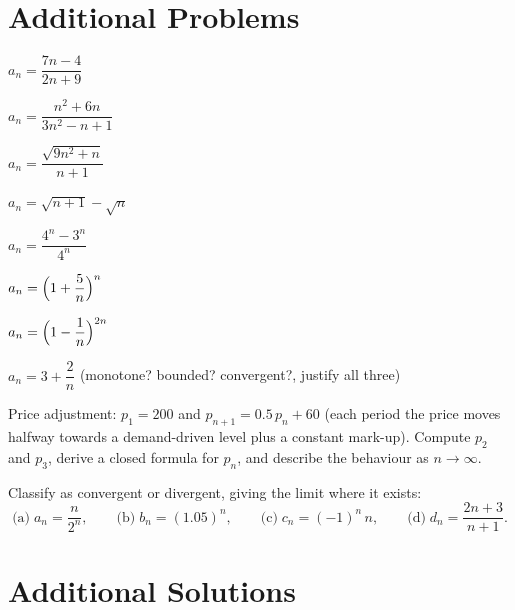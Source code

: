 \section{Additional Problems}

\begin{problems}
  \item $a_{n}=\dfrac{7n-4}{2n+9}$
  \item $a_{n}=\dfrac{n^{2}+6n}{3n^{2}-n+1}$
  \item $a_{n}=\dfrac{\sqrt{9n^{2}+n}}{n+1}$
  \item $a_{n}=\sqrt{n+1}-\sqrt{n}$
  \item $a_{n}=\dfrac{4^{n}-3^{n}}{4^{n}}$
  \item $a_{n}=\Bigl(1+\dfrac{5}{n}\Bigr)^{n}$
  \item $a_{n}=\Bigl(1-\dfrac{1}{n}\Bigr)^{2n}$
  \item $a_{n}=3+\dfrac{2}{n}$ \quad (monotone? bounded? convergent?,
        justify all three)
  \item Price adjustment: $p_{1}=200$ and $p_{n+1}=0.5\,p_{n}+60$ (each
        period the price moves halfway towards a demand-driven level plus
        a constant mark-up). Compute $p_{2}$ and $p_{3}$, derive a closed
        formula for $p_{n}$, and describe the behaviour as $n\to\infty$.
  \item Classify as convergent or divergent, giving the limit where it
        exists:
        \[
          \text{(a)}\; a_{n}=\frac{n}{2^{n}},\qquad
          \text{(b)}\; b_{n}=(1.05)^{n},\qquad
          \text{(c)}\; c_{n}=(-1)^{n}\,n,\qquad
          \text{(d)}\; d_{n}=\frac{2n+3}{n+1}.
        \]
\end{problems}

\section{Additional Solutions}

